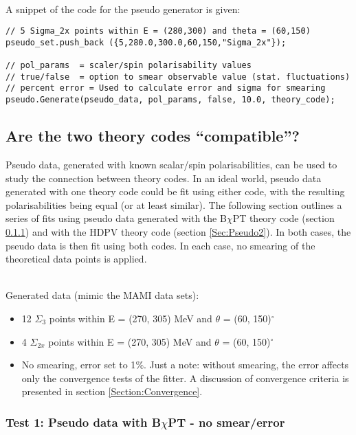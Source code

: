 \documentclass[]{article}
\begin{document}
\noindent \\A snippet of the code for the pseudo generator is given:\\

\begin{lstlisting}
// 5 Sigma_2x points within E = (280,300) and theta = (60,150) 
pseudo_set.push_back ({5,280.0,300.0,60,150,"Sigma_2x"});

// pol_params  = scaler/spin polarisability values
// true/false  = option to smear observable value (stat. fluctuations)
// percent error = Used to calculate error and sigma for smearing
pseudo.Generate(pseudo_data, pol_params, false, 10.0, theory_code);

\end{lstlisting}
\vspace{15mm}
\subsection{Are the two theory codes \enquote{compatible}?}

Pseudo data, generated with known scalar/spin polarisabilities, can be used to study the connection between theory codes. In an ideal world, pseudo data generated with one theory code could be fit using either code, with the resulting polarisabilities being equal (or at least similar). The following section outlines a series of fits using pseudo data generated with the B$\chi$PT theory code (section \ref{Sec:Pseudo1}) and with the HDPV theory code (section \ref{Sec:Pseudo2}). In both cases, the pseudo data is then fit using both codes. In each case, no smearing of the theoretical data points is applied.

\noindent \\Generated data (mimic the MAMI data sets):
\begin{itemize}
	\item 12 $\Sigma_3$ points within E = (270, 305) MeV and $\theta$ = (60, 150)$^{\circ}$
	\item 4 $\Sigma_{2x}$ points within E = (270, 305) MeV and $\theta$ = (60, 150)$^{\circ}$
	\item No smearing, error set to 1$\%$. Just a note: without smearing, the error affects only the convergence tests of the fitter. A discussion of convergence criteria is presented in section \ref{Section:Convergence}.
\end{itemize}

\newpage
\subsubsection{Test 1: Pseudo data with B$\chi$PT - no smear/error} \label{Sec:Pseudo1}
\end{document}
